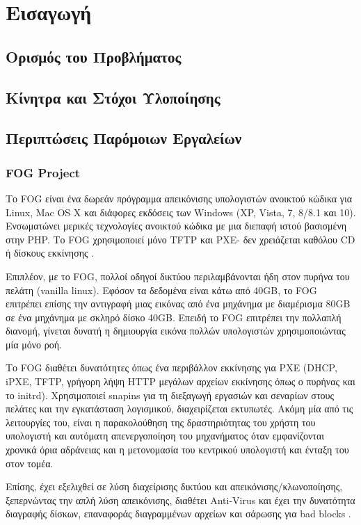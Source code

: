 \chapter{Εισαγωγή}
\section{Ορισμός του Προβλήματος}

\section{Κίνητρα και Στόχοι Υλοποίησης}

\section{Περιπτώσεις Παρόμοιων Εργαλείων}
\subsection{FOG Project}
Το FOG είναι ένα δωρεάν πρόγραμμα απεικόνισης υπολογιστών ανοικτού κώδικα για Linux, Mac OS X και διάφορες εκδόσεις των Windows (XP, Vista, 7, 8/8.1 και 10). Ενσωματώνει μερικές τεχνολογίες ανοικτού κώδικα με μια διεπαφή ιστού βασισμένη στην PHP. Το FOG χρησιμοποιεί μόνο TFTP και PXE- δεν χρειάζεται καθόλου CD ή δίσκους εκκίνησης \cite{FOG_Project_2020}. 

Επιπλέον, με το FOG, πολλοί οδηγοί δικτύου περιλαμβάνονται ήδη στον πυρήνα του πελάτη (vanilla linux). Εφόσον τα δεδομένα είναι κάτω από 40GB, το FOG επιτρέπει επίσης την αντιγραφή μιας εικόνας από ένα μηχάνημα με διαμέρισμα 80GB σε ένα μηχάνημα με σκληρό δίσκο 40GB. Επειδή το FOG επιτρέπει την πολλαπλή διανομή, γίνεται δυνατή η δημιουργία εικόνα πολλών υπολογιστών χρησιμοποιώντας μία μόνο ροή. 

Το FOG  διαθέτει δυνατότητες  όπως ένα περιβάλλον εκκίνησης για PXE (DHCP, iPXE, TFTP, γρήγορη λήψη HTTP μεγάλων αρχείων εκκίνησης όπως ο πυρήνας και το initrd). Χρησιμοποιεί snapins για τη διεξαγωγή εργασιών και σεναρίων στους πελάτες και την εγκατάσταση λογισμικού, διαχειρίζεται εκτυπωτές. 
Ακόμη μία από τις λειτουργίες του, είναι η παρακολούθηση της δραστηριότητας του χρήστη του υπολογιστή και αυτόματη απενεργοποίηση του μηχανήματος όταν εμφανίζονται χρονικά όρια αδράνειας και η μετονομασία του κεντρικού υπολογιστή και ένταξη του στον τομέα.

Επίσης, έχει εξελιχθεί σε λύση διαχείρισης δικτύου και απεικόνισης/κλωνοποίησης, ξεπερνώντας την απλή λύση απεικόνισης, διαθέτει Anti-Virus και έχει την δυνατότητα διαγραφής δίσκων, επαναφοράς διαγραμμένων αρχείων και σάρωσης για bad blocks \cite{FOG_2020}.

